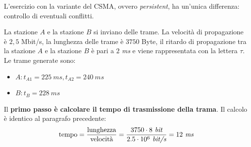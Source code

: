 \documentclass[a4paper]{article}
\begin{document}
	L'esercizio con la variante del CSMA, ovvero \emph{persistent}, ha un'unica differenza: controllo di eventuali conflitti.\newline
	
	\noindent
	La stazione $A$ e la stazione $B$ si inviano delle trame. La velocità di propagazione è $2,5$ Mbit/s, la lunghezza delle trame è $3750$ Byte, il ritardo di propagazione tra la stazione $A$ e la stazione $B$ è pari a $2$ \emph{ms} e viene rappresentata con la lettera $\tau$. Le trame generate sono:
	\begin{itemize}[label=-]
		\item $A: t_{A1} = 225 \: ms, t_{A2} = 240 \: ms$
		\item $B: t_{B} = 228 \: ms$
	\end{itemize}

	\noindent
	Il \textbf{primo passo è calcolare il tempo di trasmissione della trama}. Il calcolo è identico al paragrafo precedente:
	\begin{equation*}
	\text{tempo} = \dfrac{\text{lunghezza}}{\text{velocità}} = \dfrac{3750 \cdot 8 \emph{ bit}}{2.5 \cdot 10^{6} \emph{ bit/s}} = 12 \emph{ ms}
	\end{equation*}
\end{document}
